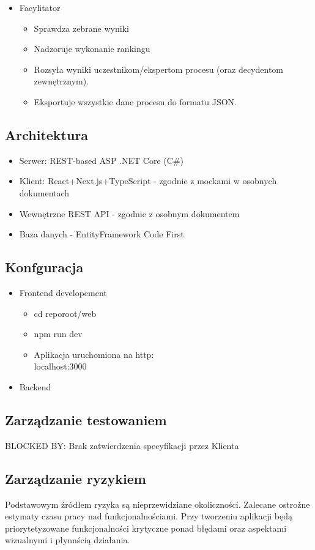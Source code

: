 \documentclass{article}
\begin{document}
\begin{itemize}
    \item Facylitator
    \begin{itemize}
        \item Sprawdza zebrane wyniki
        \item Nadzoruje wykonanie rankingu
        \item Rozsyła wyniki uczestnikom/ekspertom procesu (oraz decydentom zewnętrznym).
        \item Eksportuje wszystkie dane procesu do formatu JSON. 
    \end{itemize}
\end{itemize}

\subsection{Architektura}
\begin{itemize}
	\item Serwer: REST-based ASP .NET Core (C\#)
	\item Klient: React+Next.js+TypeScript - zgodnie z mockami w osobnych dokumentach
	\item Wewnętrzne REST API - zgodnie z osobnym dokumentem
	\item Baza danych - EntityFramework Code First
\end{itemize}

\subsection{Konfguracja}
\begin{itemize}
	\item Frontend developement
	\begin{itemize}
        \item cd reporoot/web
        \item npm run dev
        \item Aplikacja uruchomiona na http:\\localhost:3000
	\end{itemize}
	\item Backend
\end{itemize}
	
\subsection{Zarządzanie testowaniem}
BLOCKED BY: Brak zatwierdzenia specyfikacji przez Klienta 

\subsection{Zarządzanie ryzykiem}
Podstawowym źródłem ryzyka są nieprzewidziane okoliczności. Zalecane ostrożne estymaty czasu pracy nad funkcjonalnościami.
Przy tworzeniu aplikacji będą priorytetyzowane funkcjonalności krytyczne ponad błędami oraz aspektami wizualnymi i płynnścią działania.
\end{document}
